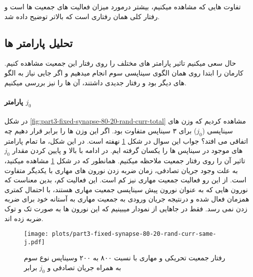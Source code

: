            تفاوت هایی که مشاهده میکنیم، بیشتر درمورد میزان فعالیت های جمعیت ها است و رفتار کلی همان رفتاری است که بالاتر توضیح داده شد. 

        \subsection{ تحلیل پارامتر ها}
            حال سعی میکنیم تاثیر پارامتر های مختلف را روی رفتار این جمعیت مشاهده کنیم. کارمان را ابتدا روی همان الگوی سیناپسی سوم انجام میدهیم و اگر جایی نیاز به الگو های دیگر بود و رفتار جدیدی داشتند، آن ها را نیز بررسی میکنیم.

            \paragraph*{پارامتر $j_0$}
                در شکل 
                \ref{fig:part3-fixed-synapse-80-20-rand-curr-total}
                مشاهده کردیم که وزن های سیناپسی
                ($j_0$)
                برای ۳ سیناپس متفاوت بود. اگر این وزن ها را برابر قرار دهیم چه اتفاقی می افتد؟ جواب این سوال در شکل
                \ref{fig:part3-fixed-synapse-80-20-rand-curr-same-j}
                نهفته است. در این شکل، ما تمام پارامتر های موجود در سیناپس ها را یکسان گرفته ایم. در ادامه با بالا و پایین کردن مقدار 
                $j_0$ 
                تاثیر آن را روی رفتار جمعیت ملاحظه میکنیم.
                همانطور که در شکل 
                \ref{fig:part3-fixed-synapse-80-20-rand-curr-same-j}
                مشاهده میکنید، به علت وجود جریان تصادفی، زمان ضربه زدن نورون های مهاری با یکدیگر متفاوت است. از این رو فعالیت جمعیت مهاری نیز کم است. این فعالیت کم، بدین معناست که نورون هایی که به عنوان نورون پیش سیناپسی جمعیت مهاری هستند، با احتمال کمتری همزمان فعال شده و درنتیجه جریان ورودی به جمعیت مهاری به آستانه خود برای ضربه زدن نمی رسد. فقط در جاهایی از نمودار میبینیم که این نورون ها به صورت تک و توک ضربه زده اند.
                \begin{figure}[!ht]
                    \centering
                    \texttt{[image: plots/part3-fixed-synapse-80-20-rand-curr-same-j.pdf]} 
                    \caption{رفتار جمعیت تحریکی و مهاری با نسبت ۸۰۰ به ۲۰۰ وسیناپس نوع سوم به همراه جریان تصادفی و $j_0$ برابر}
                    \label{fig:part3-fixed-synapse-80-20-rand-curr-same-j}
                \end{figure}
                
